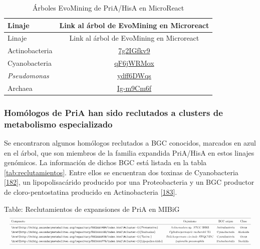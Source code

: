 \documentclass[12pt,twoside]{reedthesis}
\begin{document}
  \begin{longtable}[]{@{}lc@{}}
  \caption{Árboles EvoMining de PriA/HisA en MicroReact
  \label{tab:arboles}}\tabularnewline
  \toprule
  Linaje & Link al árbol de EvoMining en Microreact\tabularnewline
  \midrule
  \endfirsthead
  \toprule
  Linaje & Link al árbol de EvoMining en Microreact\tabularnewline
  \midrule
  \endhead
  Actinobacteria &
  \href{https://microreact.org/project/7g2IGfkv9}{7g2IGfkv9}\tabularnewline
  Cyanobacteria &
  \href{https://microreact.org/project/qF6jWRMox}{qF6jWRMox}\tabularnewline
  \emph{Pseudomonas} &
  \href{https://microreact.org/project/ydff6DWqs}{ydff6DWqs}\tabularnewline
  Archaea &
  \href{https://microreact.org/project/Ig-m9Cm6f}{Ig-m9Cm6f}\tabularnewline
  \bottomrule
  \end{longtable}
  
  \subsubsection{Homólogos de PriA han sido reclutados a clusters de
  metabolismo
  especializado}\label{homologos-de-pria-han-sido-reclutados-a-clusters-de-metabolismo-especializado}
  
  Se encontraron algunos homólogos reclutados a BGC conocidos, marcados en
  azul en el árbol, que son miembros de la familia expandida PriA/HisA en
  estos linajes genómicos. La información de dichos BGC está listada en la
  tabla \autoref{tab:reclutamientos}. Entre ellos se encuentran dos
  toxinas de Cyanobacteria
  {[}\protect\hyperlink{ref-moustafa_origin_2009}{182}{]}, un
  lipopolisacárido producido por una Proteobacteria y un BGC productor de
  cloro-pentostatina producido en Actinobacteria
  {[}\protect\hyperlink{ref-gao_biosynthesis_2017}{183}{]}.
  
  Table: Reclutamientos de expansiones de PriA en MIBiG
  \label{tab:reclutamientos}\\
  \[
  \resizebox{\columnwidth}{!}{%
  \begin{tabular}{ l c c c}
  \hline \\ [-1.5ex]  
  Compuesto & Organismo & BGC origen & Clase \\ [1ex]  
  \hline \\ [-1.5ex]
  \href{http://mibig.secondarymetabolites.org/repository/BGC0001484/index.html\#cluster-1}{Pentostatina}&\textit{Actinomadura} sp. ATCC 39365&Actinobacteria& Otros     \\ [1ex]  
  \href{http://mibig.secondarymetabolites.org/repository/BGC0000188/index.html\#cluster-1}{Saxitoxina}&\textit{Cylindrospermopsis~raciborskii} T3&Cyanobacteria&Alcaloide \\ [1ex]  
  \href{http://mibig.secondarymetabolites.org/repository/BGC0000928/index.html\#cluster-1}{Toxina }&\textit{Dolichospermum~circinale} AWQC131C & Cyanobacteria & Otros    \\ [1ex]  
  \href{http://mibig.secondarymetabolites.org/repository/BGC0000775/index.html\#cluster-1}{Lipopolisacárido}  &\textit{Legionella~pneumophila}    & Proteobacteria & Sac\'arido    \\ [1ex]  
  \hline
  \end{tabular}}
  \] \normalsize
  
\end{document}
